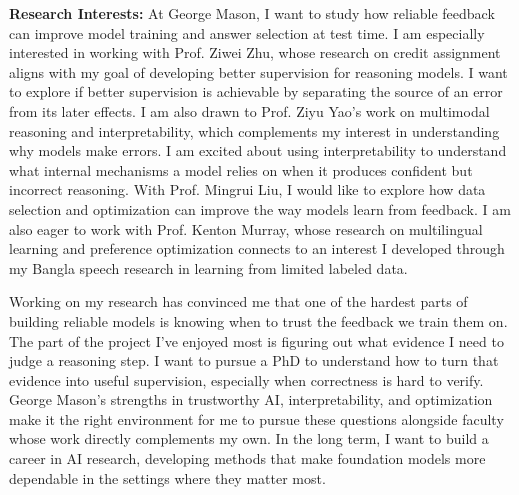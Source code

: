 \documentclass{article}
\begin{document}

\textbf{Research Interests:} At George Mason, I want to study how reliable feedback can improve model training and answer selection at test time. I am especially interested in working with Prof. Ziwei Zhu, whose research on credit assignment aligns with my goal of developing better supervision for reasoning models. I want to explore if better supervision is achievable by separating the source of an error from its later effects. I am also drawn to Prof. Ziyu Yao's work on multimodal reasoning and interpretability, which complements my interest in understanding why models make errors. I am excited about using interpretability to understand what internal mechanisms a model relies on when it produces confident but incorrect reasoning. With Prof. Mingrui Liu, I would like to explore how data selection and optimization can improve the way models learn from feedback. I am also eager to work with Prof. Kenton Murray, whose research on multilingual learning and preference optimization connects to an interest I developed through my Bangla speech research in learning from limited labeled data.



Working on my research has convinced me that one of the hardest parts of building reliable models is knowing when to trust the feedback we train them on. The part of the project I've enjoyed most is figuring out what evidence I need to judge a reasoning step. I want to pursue a PhD to understand how to turn that evidence into useful supervision, especially when correctness is hard to verify. George Mason's strengths in trustworthy AI, interpretability, and optimization make it the right environment for me to pursue these questions alongside faculty whose work directly complements my own. In the long term, I want to build a career in AI research, developing methods that make foundation models more dependable in the settings where they matter most.


\end{document}
